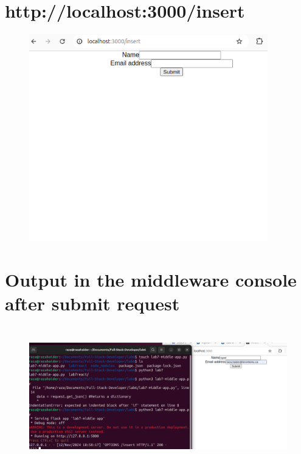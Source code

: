 \documentclass[letterpaper,11pt]{texMemo2} %
\begin{document}
	
	\maketitle %
	
	
	
	
	
	\section{http://localhost:3000/insert}
	\begin{figure}[htp]
		\centering 
		
			\includegraphics[clip,width=1\columnwidth,height=9cm]{102}%
		
	\end{figure}
		\section{Output in the middleware console after submit request}
		\begin{figure}[htp]
		\centering 

			\includegraphics[clip,width=0.8\columnwidth,height=6cm]{101}%
			
			
		\end{figure}
	\newpage
	
		
\end{document}

